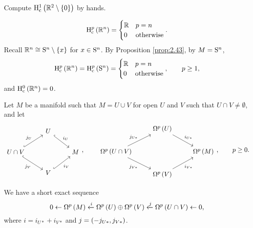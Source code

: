 \begin{exercise*}
Compute $ \H_\c^1\br{\RR^2 \setminus \cbr{0}} $ by hands.
\end{exercise*}

\begin{example}
$$ \H_\c^p\br{\RR^n} =
\begin{cases}
\RR & p = n \\
0 & \text{otherwise}
\end{cases}.
$$
Recall $ \RR^n \cong \S^n \setminus \cbr{x} $ for $ x \in \S^n $. By Proposition \ref{prop:2.43}, by $ M = \S^n $,
$$ \H_\c^p\br{\RR^n} = \H_\c^p\br{\S^n} =
\begin{cases}
\RR & p = n \\
0 & \text{otherwise}
\end{cases},
\qquad p \ge 1, $$
and $ \H_\c^0\br{\RR^n} = 0 $.
\end{example}

\pagebreak


Let $ M $ be a manifold such that $ M = U \cup V $ for open $ U $ and $ V $ such that $ U \cap V \ne \emptyset $, and let
$$
\begin{tikzcd}
& U \arrow[hookrightarrow]{dr}{i_U} & \\
U \cap V \arrow[hookrightarrow]{ur}{j_U} \arrow[hookrightarrow, swap]{dr}{j_V} & & M \\
& V \arrow[hookrightarrow, swap]{ur}{i_V} &
\end{tikzcd},
\qquad
\begin{tikzcd}
& \Omega^p\br{U} \arrow{dr}{i_{U*}} & \\
\Omega^p\br{U \cap V} \arrow{ur}{j_{U*}} \arrow[swap]{dr}{j_{V*}} & & \Omega^p\br{M} \\
& \Omega^p\br{V} \arrow[swap]{ur}{i_{V*}} &
\end{tikzcd},
\qquad p \ge 0. $$

\begin{proposition}
We have a short exact sequence
$$ 0 \leftarrow \Omega^p\br{M} \xleftarrow{i} \Omega^p\br{U} \oplus \Omega^p\br{V} \xleftarrow{j} \Omega^p\br{U \cap V} \leftarrow 0, $$
where $ i = i_{U*} + i_{V*} $ and $ j = \br{-j_{U*}, j_{V*}} $.
\end{proposition}

